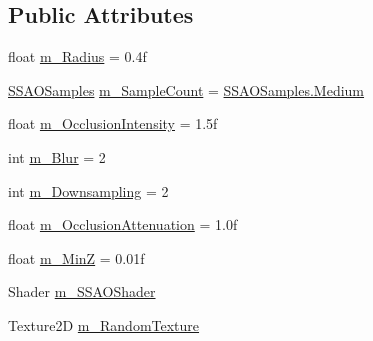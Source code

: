\subsection*{Public Attributes}
\begin{DoxyCompactItemize}
\item 
float \mbox{\hyperlink{class_unity_standard_assets_1_1_image_effects_1_1_screen_space_ambient_occlusion_ad1dfd9ccf4fbe47c3a84498f1aced046}{m\+\_\+\+Radius}} = 0.\+4f
\item 
\mbox{\hyperlink{class_unity_standard_assets_1_1_image_effects_1_1_screen_space_ambient_occlusion_ad3f9892497dd8bf8570c4e61584f3df0}{S\+S\+A\+O\+Samples}} \mbox{\hyperlink{class_unity_standard_assets_1_1_image_effects_1_1_screen_space_ambient_occlusion_a2cb70abfea811ec1383d7c87d3cc1803}{m\+\_\+\+Sample\+Count}} = \mbox{\hyperlink{class_unity_standard_assets_1_1_image_effects_1_1_screen_space_ambient_occlusion_ad3f9892497dd8bf8570c4e61584f3df0a87f8a6ab85c9ced3702b4ea641ad4bb5}{S\+S\+A\+O\+Samples.\+Medium}}
\item 
float \mbox{\hyperlink{class_unity_standard_assets_1_1_image_effects_1_1_screen_space_ambient_occlusion_aebaf58e51a11553546f5cbe81d06d26f}{m\+\_\+\+Occlusion\+Intensity}} = 1.\+5f
\item 
int \mbox{\hyperlink{class_unity_standard_assets_1_1_image_effects_1_1_screen_space_ambient_occlusion_ac1c8e1d206f71bd7df2fef5e7d5f90de}{m\+\_\+\+Blur}} = 2
\item 
int \mbox{\hyperlink{class_unity_standard_assets_1_1_image_effects_1_1_screen_space_ambient_occlusion_a67d66cec8be8425742f35c380dbc8df6}{m\+\_\+\+Downsampling}} = 2
\item 
float \mbox{\hyperlink{class_unity_standard_assets_1_1_image_effects_1_1_screen_space_ambient_occlusion_a74915c98fe63322b9144c4a13e68efbf}{m\+\_\+\+Occlusion\+Attenuation}} = 1.\+0f
\item 
float \mbox{\hyperlink{class_unity_standard_assets_1_1_image_effects_1_1_screen_space_ambient_occlusion_aa148c5da8cd9252f23e90a7a7be8d7ef}{m\+\_\+\+MinZ}} = 0.\+01f
\item 
Shader \mbox{\hyperlink{class_unity_standard_assets_1_1_image_effects_1_1_screen_space_ambient_occlusion_ae59c1f01ff257b1f1cdb6c1716eb1aa7}{m\+\_\+\+S\+S\+A\+O\+Shader}}
\item 
Texture2D \mbox{\hyperlink{class_unity_standard_assets_1_1_image_effects_1_1_screen_space_ambient_occlusion_a309e0c2af7c7feab406ddd22f6046832}{m\+\_\+\+Random\+Texture}}
\end{DoxyCompactItemize}


